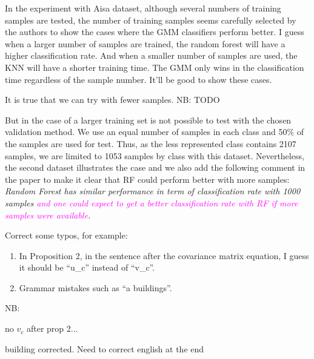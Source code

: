 \documentclass[a4paper,10pt,DIV=16]{scrartcl}
\newcommand{\rev}[1]{\textcolor{magenta}{#1}}
\begin{document}
\begin{revbox}
  In the experiment with Aisa dataset, although several numbers of training samples are tested, the number of training samples seems carefully selected by the authors to show the cases where the GMM classifiers perform better. I guess when a larger number of samples are trained, the random forest will have a higher classification rate. And when a smaller number of samples are used, the KNN will have a shorter training time. The GMM only wins in the classification time regardless of the sample number. It’ll be good to show these cases.
  \begin{resbox}
    It is true that we can try with fewer samples. NB: TODO
    
    But in the case of a larger training set is not possible to test with the chosen validation method. We use an equal number of samples in each class and 50\% of the samples are used for test. Thus, as the less represented class contains 2107 samples, we are limited to 1053 samples by class with this dataset. Nevertheless, the second dataset illustrates the case and we also add the following comment in the paper to make it clear that RF could perform better with more samples:
    \emph{Random Forest has similar performance in term of classification rate with 1000 samples \rev{ and one could expect to get a better classification rate with RF if more samples were available}.}
  \end{resbox}
\end{revbox}

\begin{revbox}
  Correct some typos, for example:
  \begin{enumerate}
    \item In Proposition 2, in the sentence after the covariance matrix equation, I guess it should be ``u\_c'' instead of ``v\_c''.
    \item Grammar mistakes such as ``a buildings''.
  \end{enumerate}
  \begin{resbox}
    NB:

    no $v_c$ after prop 2...

    building corrected. Need to correct english at the end
  \end{resbox}
\end{revbox}
\end{document}
